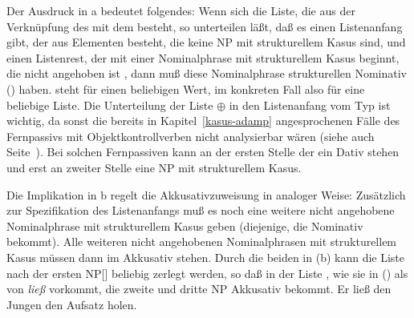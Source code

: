 {\noindent
Der Ausdruck in a bedeutet folgendes: Wenn sich die Liste, die aus der Verknüpfung des \subjwes
mit dem \subcatw besteht, so unterteilen läßt, daß es einen Listenanfang gibt, der aus Elementen besteht,
die keine NP mit strukturellem Kasus sind, und einen Listenrest, der mit einer Nominalphrase mit strukturellem
Kasus beginnt, die nicht angehoben ist , dann muß diese Nominalphrase strukturellen
Nominativ () haben. \etag steht für einen beliebigen Wert, im konkreten Fall also für eine beliebige Liste.
Die Unterteilung der Liste  $\oplus$  in den Listenanfang vom Typ 
ist wichtig, da sonst die bereits in Kapitel~\ref{kasus-adamp} angesprochenen Fälle des Fernpassivs mit Objektkontrollverben
nicht analysierbar wären (siehe auch Seite~\pageref{page-remote-passive-erlauben}). Bei solchen
Fernpassiven kann an der ersten Stelle der \subcatl ein Dativ stehen und erst an zweiter Stelle eine
NP mit strukturellem Kasus.

Die Implikation in b regelt die Akkusativzuweisung in analoger Weise: Zusätzlich
zur Spezifikation des Listenanfangs muß es noch eine weitere nicht angehobene
Nominalphrase mit strukturellem Kasus geben (diejenige, die Nominativ bekommt). Alle weiteren
nicht angehobenen Nominalphrasen mit strukturellem Kasus  müssen dann im Akkusativ stehen.
Durch die beiden \etag in (b) kann die Liste nach der ersten NP[\str] beliebig zerlegt werden,
so daß \zb in der Liste , wie sie in () als \subcatl
von \emph{ließ} vorkommt, die zweite und dritte NP Akkusativ bekommt.
\ea
Er ließ den Jungen den Aufsatz holen.
\z






}
